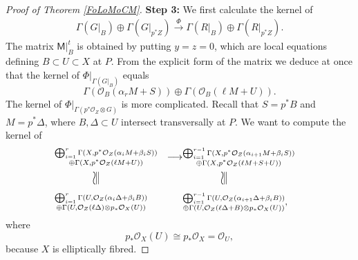 \documentclass{amsart}
\theoremstyle{definition}
\renewcommand{\O}{\mathcal{O}}
\begin{document}
\begin{proof}[Proof of Theorem \ref{FoLoMoCM}]
\noindent \textbf{Step 3:} We first calculate the kernel of 
\begin{align*}
\Gamma(G|_B) \oplus \Gamma(G|_{p^*Z}) \stackrel{\Phi}{\longrightarrow} \Gamma(R|_B) \oplus \Gamma(R|_{p^*Z}).
\end{align*}
The matrix $\mathsf{M}|_B^t$ is obtained by putting $y=z=0$, which are local equations defining $B \subset U \subset X$ at $P$. From the explicit form of the matrix we deduce at once that the kernel of $\Phi|_{\Gamma(G|_B)}$ equals
\[
\Gamma(\O_B(\alpha_r M + S)) \oplus \Gamma(\O_B(\ell M + U)).
\]
The kernel of $\Phi|_{\Gamma(p^* \O_Z \otimes G)}$ is more complicated. Recall that $S = p^*B$ and $M = p^* \Delta$, where $B, \Delta \subset U$ intersect transversally at $P$. We want to compute the kernel of
\begin{alignat}{3} 
&\substack{\bigoplus_{i=1}^{r} \Gamma(X,p^* \O_Z(\alpha_i M + \beta_i S)) \\ \oplus \Gamma(X,p^* \O_Z(\ell M + U))}& \longrightarrow &\substack{\bigoplus_{i=1}^{r-1} \Gamma(X,p^* \O_Z(\alpha_{i+1} M + \beta_i S)) \\ \oplus \Gamma(X,p^* \O_Z(\ell M + S + U))}& \nonumber \\
&\qquad\qquad\rotatebox{90}{\scalebox{2}[1]{$\cong$}}& &\qquad\qquad\rotatebox{90}{\scalebox{2}[1]{$\cong$}}& \label{Phi} \\
&\substack{\bigoplus_{i=1}^{r} \Gamma(U,\O_Z(\alpha_i \Delta + \beta_i B)) \\ \oplus \Gamma(U,\O_Z(\ell \Delta) \otimes p_* \O_X(U))}&  &\substack{\bigoplus_{i=1}^{r-1} \Gamma(U, \O_Z(\alpha_{i+1} \Delta + \beta_i B)) \\ \oplus \Gamma(U, \O_Z(\ell \Delta + B) \otimes p_* \O_X(U))},& \nonumber
\end{alignat}
where
\[
p_* \O_X(U) \cong p_* \O_X = \O_U,
\]
because $X$ is elliptically fibred. 


\end{proof}
\end{document}
